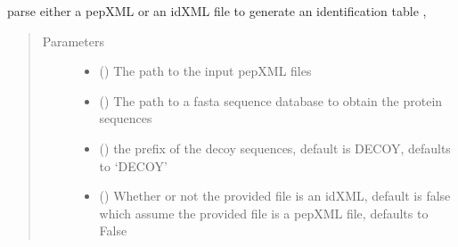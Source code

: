 \documentclass[letterpaper,10pt,english]{sphinxmanual}
\begin{document}
\begin{fulllineitems}
\label{\detokenize{IPTK.IO:IPTK.IO.InFunctions.parse_xml_based_format_to_identification_table}}
parse either a pepXML or an idXML file to generate an identification table ,
\begin{quote}\begin{description}
\item[{Parameters}] \leavevmode\begin{itemize}
\item {} 
 () \textendash{} The path to the input pepXML files

\item {} 
 () \textendash{} The path to a fasta sequence database to obtain the protein sequences

\item {} 
 (\sphinxstyleliteralemphasis{\sphinxupquote{, }}) \textendash{} the prefix of the decoy sequences, default is DECOY, defaults to ‘DECOY’

\item {} 
 (\sphinxstyleliteralemphasis{\sphinxupquote{, }}) \textendash{} Whether or not the provided file is an idXML, default is false which assume the provided file is a pepXML file, defaults to False


\end{itemize}
\end{description}
\end{quote}
\end{fulllineitems}
\end{document}
